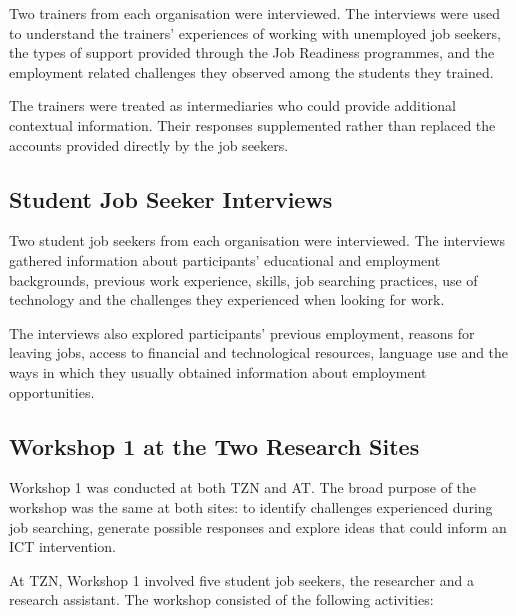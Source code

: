 Two trainers from each organisation were interviewed. The interviews were used to understand the trainers' experiences of working with unemployed job seekers, the types of support provided through the Job Readiness programmes, and the employment related challenges they observed among the students they trained.

The trainers were treated as intermediaries who could provide additional contextual information. Their responses supplemented rather than replaced the accounts provided directly by the job seekers.


\subsection{Student Job Seeker Interviews}

Two student job seekers from each organisation were interviewed. The interviews gathered information about participants' educational and employment backgrounds, previous work experience, skills, job searching practices, use of technology and the challenges they experienced when looking for work.

The interviews also explored participants' previous employment, reasons for leaving jobs, access to financial and technological resources, language use and the ways in which they usually obtained information about employment opportunities.


\subsection{Workshop 1 at the Two Research Sites}

Workshop 1 was conducted at both TZN and AT. The broad purpose of the workshop was the same at both sites: to identify challenges experienced during job searching, generate possible responses and explore ideas that could inform an ICT intervention.

At TZN, Workshop 1 involved five student job seekers, the researcher and a research assistant. The workshop consisted of the following activities:

